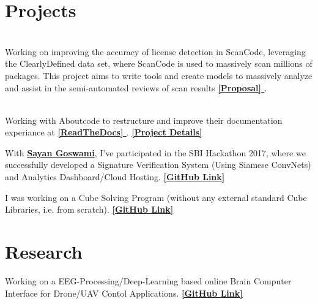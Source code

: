 \documentclass[]{deedy-resume-openfont}
\begin{document}
\hfill
\begin{minipage}[t]{0.66\textwidth} 


\section{Projects}

 \\
Working on improving the accuracy of license detection in ScanCode, leveraging the ClearlyDefined data set, where ScanCode is used to massively scan millions of packages. This project aims to write tools and create models to massively analyze and assist in the semi-automated reviews of scan results \textbf{\href{https://ayansinha.dev/assets/gsoc-proposal.pdf}{ [Proposal] }}.  
\sectionsep

 \\
Working with Aboutcode to restructure and improve their documentation experiance at \textbf{\href{https://aboutcode.readthedocs.io}{ [ReadTheDocs] }}.   \textbf{\href{https://developers.google.com/season-of-docs/docs/participants/project-aboutcode}{ [Project Details] }}
\sectionsep


With \textbf{\href{https://github.com/Sayan98}{Sayan Goswami}}, I've participated in the SBI Hackathon 2017, where we successfully developed a Signature Verification System (Using Siamese ConvNets) and Analytics Dashboard/Cloud Hosting. \textbf{\href{https://github.com/AyanSinhaMahapatra/AutoSIGN}{ [GitHub Link] }}
\sectionsep

I was working on a Cube Solving Program (without any external standard Cube Libraries, i.e. from scratch). \textbf{\href{https://github.com/AyanSinhaMahapatra/CubeSolving}{ [GitHub Link] }}
\sectionsep


\section{Research}
Working on a EEG-Processing/Deep-Learning based online Brain Computer Interface for Drone/UAV Contol Applications. 
\textbf{\href{https://github.com/AyanSinhaMahapatra/bci-nal}{ [GitHub Link] }}
\sectionsep


\end{minipage}
\end{document}
